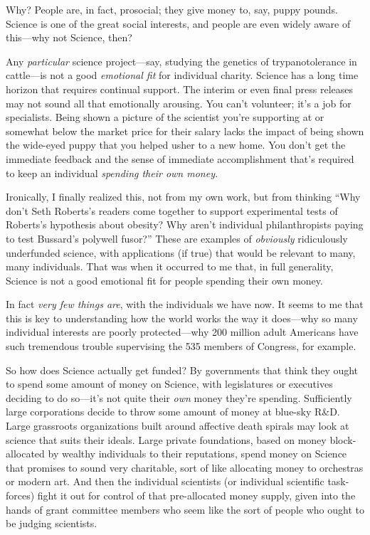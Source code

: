 {
 Why? People are, in fact, prosocial; they give money to, say,
puppy pounds. Science is one of the great social interests, and people
are even widely aware of this---why not Science, then?}

{
 Any \textit{particular} science project---say, studying the
genetics of trypanotolerance in cattle---is not a good
\textit{emotional fit} for individual charity. Science has a long time
horizon that requires continual support. The interim or even final
press releases may not sound all that emotionally arousing. You
can't volunteer; it's a job for
specialists. Being shown a picture of the scientist
you're supporting at or somewhat below the market price
for their salary lacks the impact of being shown the wide-eyed puppy
that you helped usher to a new home. You don't get the
immediate feedback and the sense of immediate accomplishment
that's required to keep an individual \textit{spending
their own money.}}

{
 Ironically, I finally realized this, not from my own work, but
from thinking ``Why don't Seth
Roberts's readers come together to support experimental
tests of Roberts's hypothesis about obesity? Why
aren't individual philanthropists paying to test
Bussard's polywell fusor?'' These are
examples of \textit{obviously} ridiculously underfunded science, with
applications (if true) that would be relevant to many, many
individuals. That was when it occurred to me that, in full generality,
Science is not a good emotional fit for people spending their own
money.}

{
 In fact \textit{very few things are}, with the individuals we have
now. It seems to me that this is key to understanding how the world
works the way it does---why so many individual interests are poorly
protected---why 200 million adult Americans have such tremendous
trouble supervising the 535 members of Congress, for example.}

{
 So how does Science actually get funded? By governments that think
they ought to spend some amount of money on Science, with legislatures
or executives deciding to do so---it's not quite their
\textit{own} money they're spending. Sufficiently large
corporations decide to throw some amount of money at blue-sky R\&D.
Large grassroots organizations built around affective death spirals may
look at science that suits their ideals. Large private foundations,
based on money block-allocated by wealthy individuals to their
reputations, spend money on Science that promises to sound very
charitable, sort of like allocating money to orchestras or modern art.
And then the individual scientists (or individual scientific
task-forces) fight it out for control of that pre-allocated money
supply, given into the hands of grant committee members who seem like
the sort of people who ought to be judging scientists.}

